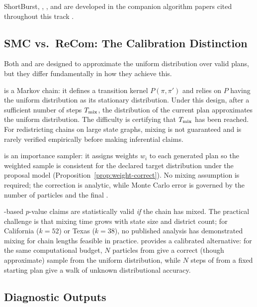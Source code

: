 ShortBurst, \be{}, \cs{}, and \flip{} are developed in the companion
algorithm papers cited throughout this track
\citep{cannon2022,g6paper,h1paper,b11paper,g8paper}.

\subsection{SMC vs.\ ReCom: The Calibration Distinction}

Both \smc{} and \recom{} are designed to approximate the uniform distribution
over valid plans, but they differ fundamentally in how they achieve this.

\recom{} is a Markov chain: it defines a transition kernel $P(\pi, \pi')$ and
relies on $P$ having the uniform distribution as its stationary distribution.
Under this design, after a sufficient number of steps $T_{\rm mix}$, the
distribution of the current plan approximates the uniform distribution.
The difficulty is certifying that $T_{\rm mix}$ has been reached.
For redistricting chains on large state graphs, mixing is not guaranteed and
is rarely verified empirically before making inferential claims.

\smc{} is an importance sampler: it assigns weights $w_i$ to each generated
plan so the weighted sample is consistent for the declared target distribution
under the proposal model (Proposition~\ref{prop:weight-correct}).
No mixing assumption is required; the correction is analytic, while Monte Carlo
error is governed by the number of particles and the final \ess{}.

\begin{remark}
\recom{}-based $p$-value claims are statistically valid \emph{if} the chain
has mixed.
The practical challenge is that mixing time grows with state size and district
count; for California ($k = 52$) or Texas ($k = 38$), no published analysis
has demonstrated mixing for chain lengths feasible in practice.
\smc{} provides a calibrated alternative: for the same computational budget,
$N$ particles from \smc{} give a correct (though approximate) sample from the
uniform distribution, while $N$ steps of \recom{} from a fixed starting plan
give a walk of unknown distributional accuracy.
\end{remark}

\subsection{Diagnostic Outputs}

